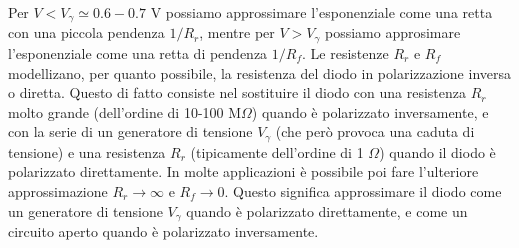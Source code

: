 \documentclass[a4paper, 11pt]{article}
\begin{document}
	\noindent Per $V<V_\gamma\simeq0.6-0.7$ V possiamo approssimare l'esponenziale come una retta con una piccola pendenza $1/R_r$, mentre per $V>V_\gamma$ possiamo approsimare l'esponenziale come una retta di pendenza $1/R_f$. Le resistenze $R_r$ e $R_f$ modellizano, per quanto possibile, la resistenza del diodo in polarizzazione inversa o diretta. Questo di fatto consiste nel sostituire il diodo con una resistenza $R_r$ molto grande (dell'ordine di 10-100 M$\Omega$) quando è polarizzato inversamente, e con la serie di un generatore di tensione $V_\gamma$ (che però provoca una caduta di tensione) e una resistenza $R_r$ (tipicamente dell'ordine di 1 $\Omega$) quando il diodo è polarizzato direttamente. In molte applicazioni è possibile poi fare l'ulteriore approssimazione $R_r\to\infty$ e $R_f\to0$. Questo significa approssimare il diodo come un generatore di tensione $V_\gamma$ quando è polarizzato direttamente, e come un circuito aperto quando è polarizzato inversamente.
	
\end{document}
